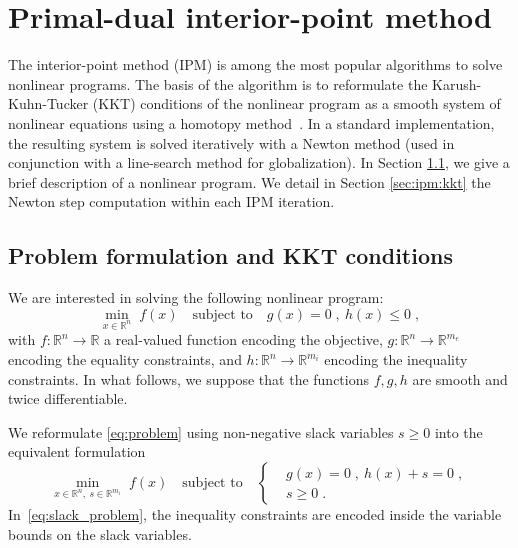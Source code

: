 \section{Primal-dual interior-point method}

The interior-point method (IPM) is among the most popular algorithms
to solve nonlinear programs. The basis of the algorithm is to
reformulate the Karush-Kuhn-Tucker (KKT) conditions of the nonlinear program as a smooth
system of nonlinear equations using a homotopy method~\cite{nocedal_numerical_2006}.
In a standard implementation, the
resulting system is solved iteratively with a Newton method (used in conjunction
with a line-search method for globalization). In Section \ref{sec:ipm:problem}, we
give a brief description of a nonlinear program.
We detail in Section \ref{sec:ipm:kkt} the Newton step computation within each IPM iteration.

\subsection{Problem formulation and KKT conditions}
\label{sec:ipm:problem}
We are interested in solving the following nonlinear program:
\begin{equation}
  \label{eq:problem}
    \min_{x \in \mathbb{R}^n} \;  f(x)
\quad \text{subject to}\quad
     g(x) = 0 \; , ~ h(x) \leq 0 \; ,
\end{equation}
with $f:\mathbb{R}^n \to \mathbb{R}$ a real-valued function
encoding the objective, $g: \mathbb{R}^n \to \mathbb{R}^{m_e}$
encoding the equality constraints, and $h: \mathbb{R}^{n} \to
\mathbb{R}^{m_i}$ encoding the inequality constraints.
In what follows, we suppose that the functions $f, g, h$ are smooth
and twice differentiable.

We reformulate \eqref{eq:problem} using non-negative slack variables $s \geq 0$
into the equivalent formulation
\begin{equation}
  \label{eq:slack_problem}
    \min_{x \in \mathbb{R}^n, ~ s \in \mathbb{R}^{m_i}} \;  f(x)
    \quad \text{subject to} \quad
    \left\{
  \begin{aligned}
    & g(x) = 0 \; , ~ h(x) + s = 0 \; , \\
      &  s \geq 0  \; .
  \end{aligned}
  \right.
\end{equation}
In~\eqref{eq:slack_problem}, the inequality constraints
are encoded inside the variable bounds on the slack variables.

